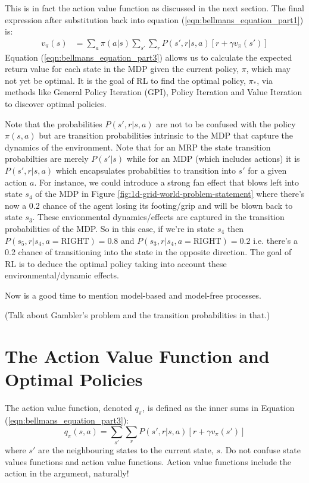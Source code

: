 \documentclass[a4paper,11pt]{article}
\begin{document}
This is in fact the action value function as discussed in the next section.  The final expression after substitution back into equation (\ref{eqn:bellmans_equation_part1}) is:
\begin{equation} \label{eqn:bellmans_equation_part3}
\begin{split}
        v_\pi (s) &= \sum_{a} \pi(a|s) \sum_{s'} \sum_r P(s',r|s,a) [r + \gamma v_{\pi}(s')]
\end{split}
\end{equation}
Equation (\ref{eqn:bellmans_equation_part3}) allows us to calculate the expected return value for each state in the MDP given the current policy, $\pi$, which may not yet be optimal.  It is the goal of RL to find the optimal policy, $\pi_*$, via methods like General Policy Iteration (GPI), Policy Iteration and Value Iteration to discover optimal policies.

Note that the probabilities $P(s',r|s,a)$ are not to be confused with the policy $\pi(s,a)$ but are transition probabilities intrinsic to the MDP that capture the dynamics of the environment.  Note that for an MRP the state transition probabilties are merely $P(s'|s)$ while for an MDP (which includes actions) it is $P(s',r|s,a)$ which encapsulates probabilties to transition into $s'$ for a given action $a$.  For instance, we could introduce a strong fan effect that blows left into state $s_4$ of the MDP in Figure \ref{fig:1d-grid-world-problem-statement} where there's now a 0.2 chance of the agent losing its footing/grip and will be blown back to state $s_3$.  These envionmental dynamics/effects are captured in the transition probabilities of the MDP.  So in this case, if we're in state $s_4$ then $P(s_5,r|s_4, a=\text{RIGHT}) = 0.8$ and $P(s_3,r|s_4, a=\text{RIGHT}) = 0.2$ i.e. there's a 0.2 chance of transitioning into the state in the opposite direction.  The goal of RL is to deduce the optimal policy taking into account these environmental/dynamic effects.

Now is a good time to mention model-based and model-free processes.

(Talk about Gambler's problem and the transition probabilities in that.)



\section{The Action Value Function and Optimal Policies}

The action value function, denoted $q_{\pi}$, is defined as the inner sums in Equation (\ref{eqn:bellmans_equation_part3}):
\begin{equation} \label{eqn:action_value_function_definition}
    q_{\pi}(s,a) = \sum_{s'} \sum_r P(s',r|s,a) [r + \gamma v_{\pi}(s')]
\end{equation}
where $s'$ are the neighbouring states to the current state, $s$.  Do not confuse state values functions and action value functions.  Action value functions include the action in the argument, naturally!
\end{document}
